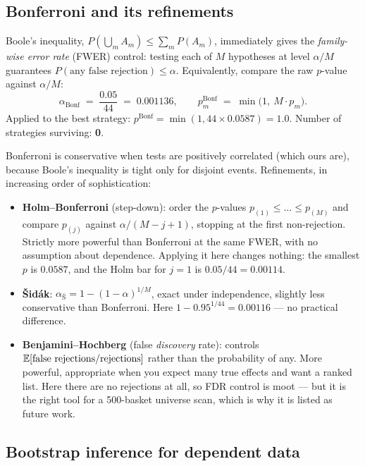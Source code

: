 \subsection{Bonferroni and its refinements}
\label{sec:mt:bonferroni}

Boole's inequality, $P(\bigcup_m A_m)\le\sum_m P(A_m)$, immediately gives the
\emph{family-wise error rate} (FWER) control: testing each of $M$ hypotheses at level
$\alpha/M$ guarantees $P(\text{any false rejection})\le\alpha$. Equivalently, compare the
raw $p$-value against $\alpha/M$:
\begin{equation}
  \alpha_{\text{Bonf}} \;=\; \frac{0.05}{44} \;=\; 0.001136,
  \qquad
  p^{\text{Bonf}}_m \;=\; \min\bigl(1,\ M\cdot p_m\bigr).
  \label{eq:bonferroni}
\end{equation}
Applied to the best strategy: $p^{\text{Bonf}}=\min(1,44\times0.0587)=1.0$. Number of
strategies surviving: \textbf{0}.

Bonferroni is conservative when tests are positively correlated (which ours are), because
Boole's inequality is tight only for disjoint events. Refinements, in increasing order of
sophistication:
\begin{itemize}
  \item \textbf{Holm--Bonferroni} (step-down): order the $p$-values
    $p_{(1)}\le\dots\le p_{(M)}$ and compare $p_{(j)}$ against $\alpha/(M-j+1)$, stopping
    at the first non-rejection. Strictly more powerful than Bonferroni at the same FWER,
    with no assumption about dependence. Applying it here changes nothing: the smallest
    $p$ is $0.0587$, and the Holm bar for $j=1$ is $0.05/44=0.00114$.
  \item \textbf{\v{S}idák}: $\alpha_{\text{\v S}}=1-(1-\alpha)^{1/M}$, exact under
    independence, slightly less conservative than Bonferroni. Here
    $1-0.95^{1/44}=0.00116$ --- no practical difference.
  \item \textbf{Benjamini--Hochberg} (false \emph{discovery} rate): controls
    $\mathbb{E}[\text{false rejections}/\text{rejections}]$ rather than the probability of any.
    More powerful, appropriate when you expect many true effects and want a ranked list.
    Here there are no rejections at all, so FDR control is moot --- but it is the right
    tool for a 500-basket universe scan, which is why it is listed as future work.
\end{itemize}

\subsection{Bootstrap inference for dependent data}
\label{sec:mt:bootstrap}

